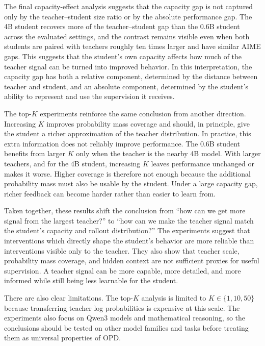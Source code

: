The final capacity-effect analysis suggests that the capacity gap is not captured only by the teacher--student size ratio or by the absolute performance gap. The 4B student recovers more of the teacher--student gap than the 0.6B student across the evaluated settings, and the contrast remains visible even when both students are paired with teachers roughly ten times larger and have similar AIME gaps. This suggests that the student's own capacity affects how much of the teacher signal can be turned into improved behavior. In this interpretation, the capacity gap has both a relative component, determined by the distance between teacher and student, and an absolute component, determined by the student's ability to represent and use the supervision it receives.

The top-$K$ experiments reinforce the same conclusion from another direction. Increasing $K$ improves probability mass coverage and should, in principle, give the student a richer approximation of the teacher distribution. In practice, this extra information does not reliably improve performance. The 0.6B student benefits from larger $K$ only when the teacher is the nearby 4B model. With larger teachers, and for the 4B student, increasing $K$ leaves performance unchanged or makes it worse. Higher coverage is therefore not enough because the additional probability mass must also be usable by the student. Under a large capacity gap, richer feedback can become harder rather than easier to learn from.

Taken together, these results shift the conclusion from ``how can we get more signal from the largest teacher?'' to ``how can we make the teacher signal match the student's capacity and rollout distribution?'' The experiments suggest that interventions which directly shape the student's behavior are more reliable than interventions visible only to the teacher. They also show that teacher scale, probability mass coverage, and hidden context are not sufficient proxies for useful supervision. A teacher signal can be more capable, more detailed, and more informed while still being less learnable for the student.

There are also clear limitations. The top-$K$ analysis is limited to $K \in \{1, 10, 50\}$ because transferring teacher log probabilities is expensive at this scale. The experiments also focus on Qwen3 models and mathematical reasoning, so the conclusions should be tested on other model families and tasks before treating them as universal properties of OPD.

